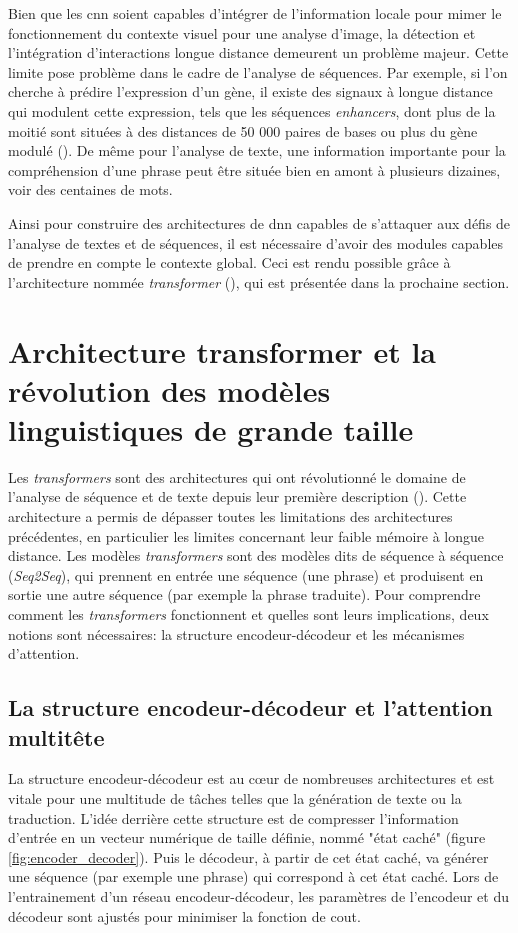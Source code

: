 Bien que les \gls{cnn} soient capables d'intégrer de l'information locale pour mimer le fonctionnement du contexte visuel pour une analyse d'image, la détection et l'intégration d'interactions longue distance demeurent un problème majeur. Cette limite pose problème dans le cadre de l'analyse de séquences. Par exemple, si l’on cherche à prédire l'expression d'un gène, il existe des signaux à longue distance qui modulent cette expression, tels que les séquences \textit{enhancers}, dont plus de la moitié sont situées à des distances de 50 000 paires de bases ou plus du gène modulé (\cite{chepelev_characterization_2012}). De même pour l'analyse de texte, une information importante pour la compréhension d'une phrase peut être située bien en amont à plusieurs dizaines, voir des centaines de mots.

Ainsi pour construire des architectures de \gls{dnn} capables de s'attaquer aux défis de l'analyse de textes et de séquences, il est nécessaire d'avoir des modules capables de prendre en compte le contexte global. Ceci est rendu possible grâce à l'architecture nommée \textit{transformer} (\cite{vaswani_attention_2017}), qui est présentée dans la prochaine section.


\section{Architecture transformer et la révolution des modèles linguistiques de grande taille}

Les \textit{transformers} sont des architectures qui ont révolutionné le domaine de l'analyse de séquence et de texte depuis leur première description (\cite{vaswani_attention_2017}). Cette architecture a permis de dépasser toutes les limitations des architectures précédentes, en particulier les limites concernant leur faible mémoire à longue distance. Les modèles \textit{transformers} sont des modèles dits de séquence à séquence (\textit{Seq2Seq}), qui prennent en entrée une séquence (une phrase) et produisent en sortie une autre séquence (par exemple la phrase traduite). Pour comprendre comment les \textit{transformers} fonctionnent et quelles sont leurs implications, deux notions sont nécessaires: la structure encodeur-décodeur et les mécanismes d'attention.

\subsection{La structure encodeur-décodeur et l'attention multitête}
La structure encodeur-décodeur est au cœur de nombreuses architectures et est vitale pour une multitude de tâches telles que la génération de texte ou la traduction. L'idée derrière cette structure est de compresser l'information d'entrée en un vecteur numérique de taille définie, nommé "état caché" (figure \ref{fig:encoder_decoder}). Puis le décodeur, à partir de cet état caché, va générer une séquence (par exemple une phrase) qui correspond à cet état caché. Lors de l'entrainement d'un réseau encodeur-décodeur, les paramètres de l'encodeur et du décodeur sont ajustés pour minimiser la fonction de cout. 


